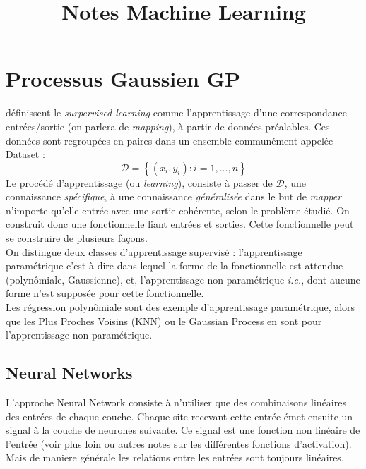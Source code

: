 \documentclass[a4paper,12pt]{report}
\title{\navy \textbf{Notes Machine Learning} \color{black}}%
\date{}
\newcommand\bk{\color{black}}
\newcommand\navy{\color{navy}}
\newcommand{\cad}{c'est-à-dire}
\numberwithin{equation}{section} %
\begin{document}
\maketitle

\tableofcontents



\newpage 

\navy \chapter{Processus Gaussien GP} \bk
\cite{rasmussen2006gaussian} définissent le \textit{surpervised learning} comme l'apprentissage d'une correspondance entrées/sortie (on parlera de \textit{mapping}), à partir de données préalables. Ces données sont regroupées en paires dans un ensemble communément appelée Dataset : \\ 
\begin{equation}
\mathcal{D} = \left\{ \left( x_i, y_i \right) : i = 1,. . ., n \right\}
\end{equation}
\noindent Le procédé d'apprentissage (ou \textit{learning}), consiste à passer de $\mathcal{D}$, une connaissance \textit{spécifique}, à une connaissance \textit{généralisée} dans le but de \textit{mapper} n'importe qu'elle entrée avec une sortie cohérente, selon le problème étudié. On construit donc une fonctionnelle liant entrées et sorties. Cette fonctionnelle peut se construire de plusieurs façons. \\

\noindent On distingue deux classes d'apprentissage supervisé : l'apprentissage paramétrique \cad $ $ dans lequel la forme de la fonctionnelle est attendue (polynômiale, Gaussienne), et, l'apprentissage non paramétrique \textit{i.e.}, dont aucune forme n'est supposée pour cette fonctionnelle.\\
Les régression polynômiale sont des exemple d'apprentissage paramétrique, alors que les Plus Proches Voisins (KNN) ou le Gaussian Process en sont pour l'apprentissage non paramétrique.\\

\section{Neural Networks}
L'approche Neural Network consiste à n'utiliser que des combinaisons linéaires des entrées de chaque couche. Chaque site recevant cette entrée émet ensuite un signal à la couche de neurones suivante. Ce signal est une fonction non linéaire de l'entrée (voir plus loin ou autres notes sur les différentes fonctions d'activation). \\
Mais de maniere générale les relations entre les entrées sont toujours linéaires.
\end{document}
